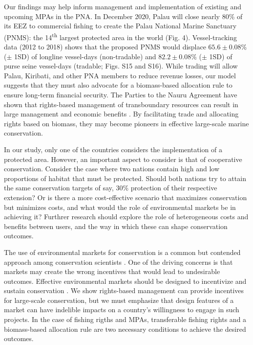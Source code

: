 \documentclass[12pt]{article}
\begin{document}
Our findings may help inform management and implementation of existing and upcoming MPAs in the PNA. In December 2020, Palau will close nearly 80\% of its EEZ to commercial fishing to create the Palau National Marine Sanctuary (PNMS): the 14\textsuperscript{th} largest protected area in the world (Fig. 4). Vessel-tracking data (2012 to 2018) shows that the proposed PNMS would displace $65.6 \pm 0.08$\% ($\pm$ 1SD) of longline vessel-days (non-tradable) and $82.2 \pm 0.08$\% ($\pm$ 1SD) of purse seine vessel-days (tradable; Figs. S15 and S16). While trading will allow Palau, Kiribati, and other PNA members to reduce revenue losses, our model suggests that they must also advocate for a biomass-based allocation rule to ensure long-term financial security. The Parties to the Nauru Agreement have shown that rights-based management of transboundary resources can result in large management and economic benefits \cite{havice_2013,aqorau_2018}. By facilitating trade and allocating rights based on biomass, they may become pioneers in effective large-scale marine conservation.

In our study, only one of the countries considers the implementation of a protected area. However, an important aspect to consider is that of cooperative conservation. Consider the case where two nations contain high and low proportions of habitat that must be protected. Should both nations try to attain the same conservation targets of say, 30\% protection of their respective extension? Or is there a more cost-effective scenario that maximizes conservation but minimizes costs, and what would the role of environmental markets be in achieving it? Furthrer research should explore the role of heterogeneous costs and benefits between users, and the way in which these can shape conservation outcomes.

The use of environmental markets for conservation is a common but contended approach among conservation scientists \cite{sandbrook_2019}. One of the driving concerns is that markets may create the wrong incentives that would lead to undesirable outcomes. Effective environmental markets should be designed to incentivize and sustain conservation \cite{adams_2014}. We show rights-based management can provide incentives for large-scale conservation, but we must emphasize that design features of a market can have indelible impacts on a country’s willingness to engage in such projects. In the case of fishing rigths and MPAs, transferable fishing rights and a biomass-based allocation rule are two necessary conditions to achieve the desired outcomes.
\end{document}

